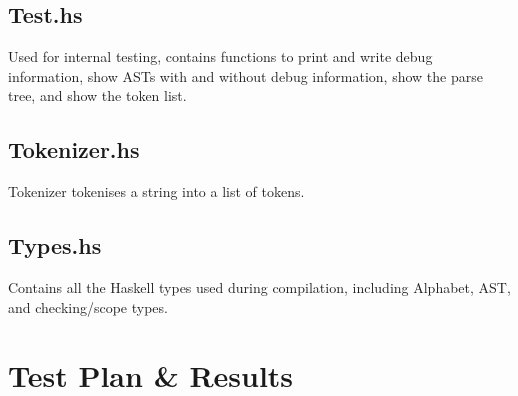 \documentclass[twoside]{report}
\begin{document}
\section{Test.hs}
Used for internal testing, contains functions to print and write debug information, show ASTs with and without debug information, show the parse tree, and show the token list.

\section{Tokenizer.hs}
Tokenizer tokenises a string into a list of tokens.

\section{Types.hs}
Contains all the Haskell types used during compilation, including Alphabet, AST, and checking/scope types.


\chapter{Test Plan \& Results}
\label{test_plan_and_results}
\end{document}

